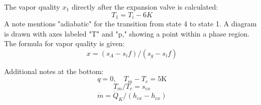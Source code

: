The vapor quality \(x_1\) directly after the expansion valve is calculated:  
\[
T_1 = T_i - 6K
\]  
A note mentions "adiabatic" for the transition from state 4 to state 1.  
A diagram is drawn with axes labeled "T" and "p," showing a point within a phase region.  
The formula for vapor quality is given:  
\[
x = (s_A - s_if) / (s_g - s_if)
\]  

Additional notes at the bottom:  
\[
q = 0, \quad T_m - T_c = 5 \text{K}
\]  
\[
T_m / T_c = s_{cx}
\]  
\[
\dot{m} = \dot{Q}_K / (h_{cx} - h_{cx})
\]